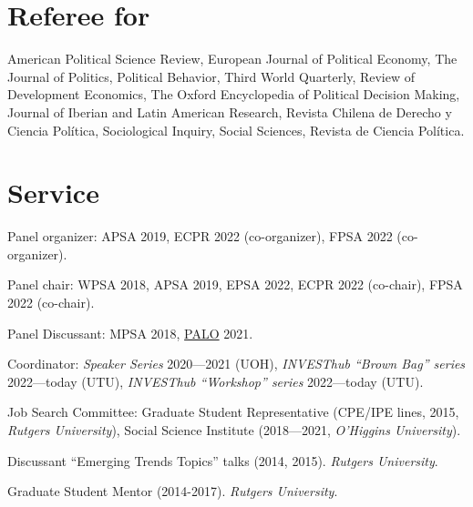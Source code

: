 \documentclass[letterpaper]{article}
\renewenvironment{itemize}{
  \begin{list}{}{
    \setlength{\leftmargin}{1.5em}
  }
}{
  \end{list}
}
\begin{document}

\section*{Referee for}
  \begin{itemize}
    \item[\textcolor{gray}{\textbullet}] American Political Science Review, European Journal of Political Economy, The Journal of Politics, Political Behavior, Third World Quarterly, Review of Development Economics, The Oxford Encyclopedia of Political Decision Making, Journal of Iberian and Latin American Research, Revista Chilena de Derecho y Ciencia Pol\'itica, Sociological Inquiry, Social Sciences, Revista de Ciencia Pol\'itica.
  \end{itemize}




\section*{Service}

\begin{itemize}
\item[\textcolor{gray}{\textbullet}] Panel organizer: APSA 2019, ECPR 2022 (co-organizer), FPSA 2022 (co-organizer).
\item[\textcolor{gray}{\textbullet}] Panel chair: WPSA 2018, APSA 2019, EPSA 2022, ECPR 2022 (co-chair), FPSA 2022 (co-chair).
\item[\textcolor{gray}{\textbullet}] Panel Discussant: MPSA 2018, \href{https://paloresearch.fi/en/events/finalconference/}{PALO} 2021.
\item[\textcolor{gray}{\textbullet}] Coordinator: \emph{Speaker Series} 2020---2021 (UOH), \emph{INVESThub ``Brown Bag'' series} 2022---today (UTU), \emph{INVESThub ``Workshop'' series} 2022---today (UTU).
\item[\textcolor{gray}{\textbullet}] Job Search Committee: Graduate Student Representative (CPE/IPE lines, 2015, \emph{Rutgers University}), Social Science Institute (2018---2021, \emph{O'Higgins University}).
\item[\textcolor{gray}{\textbullet}] Discussant ``Emerging Trends Topics'' talks (2014, 2015). \emph{Rutgers University}.
\item[\textcolor{gray}{\textbullet}] Graduate Student Mentor (2014-2017). \emph{Rutgers University}.
\end{itemize}
\end{document}
